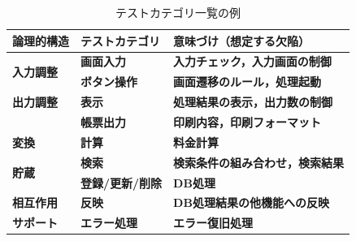 \documentclass[a4paper,11pt]{jreport}
\begin{document}
\begin{table}[htbp]
  \centering
  \caption{テストカテゴリ一覧の例}
    \begin{tabular}{|p{6em}|p{8.07em}|p{14.645em}|}
    \hline
    \textbf{論理的構造} & \textbf{テストカテゴリ} & \textbf{意味づけ（想定する欠陥）} \bigstrut\\
    \hline
    \multirow{2}[4]{*}{\textbf{入力調整}} & \textbf{画面入力} & \textbf{入力チェック，入力画面の制御} \bigstrut\\
\cline{2-3}    \multicolumn{1}{|l|}{} & \textbf{ボタン操作} & \textbf{画面遷移のルール，処理起動} \bigstrut\\
    \hline
    \textbf{出力調整} & \textbf{表示} & \textbf{処理結果の表示，出力数の制御} \bigstrut\\
    \hline
    \multicolumn{1}{|r|}{} & \textbf{帳票出力} & \textbf{印刷内容，印刷フォーマット} \bigstrut\\
    \hline
    \textbf{変換} & \textbf{計算} & \textbf{料金計算} \bigstrut\\
    \hline
    \multirow{2}[4]{*}{\textbf{貯蔵}} & \textbf{検索} & \textbf{検索条件の組み合わせ，検索結果} \bigstrut\\
\cline{2-3}    \multicolumn{1}{|l|}{} & \textbf{登録/更新/削除} & \textbf{DB処理} \bigstrut\\
    \hline
    \textbf{相互作用} & \textbf{反映} & \textbf{DB処理結果の他機能への反映} \bigstrut\\
    \hline
    \textbf{サポート} & \textbf{エラー処理} & \textbf{エラー復旧処理} \bigstrut\\
    \hline
    \end{tabular}%
  \label{tbl:D-4-tbl1}%
\end{table}%
\end{document}
